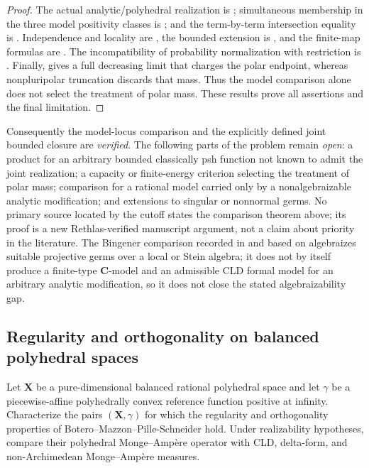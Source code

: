 \begin{proof}
The actual analytic/polyhedral realization is
; simultaneous membership in the three
model positivity classes is
; and the term-by-term
intersection equality is
.  Independence and locality
are , the bounded extension is
, and the finite-map formulas
are .  The incompatibility of
probability normalization with restriction is
.  Finally,
 gives a full decreasing limit that
charges the polar endpoint, whereas nonpluripolar truncation discards that
mass.  Thus the model comparison alone does not select the treatment of polar
mass.  These results prove all assertions and the final limitation.
\end{proof}

Consequently the model-locus comparison and the explicitly defined joint
bounded closure are \emph{verified}.  The following parts of the problem
remain \emph{open}: a product for an arbitrary
bounded classically psh function not known to admit the joint realization; a
capacity or finite-energy criterion selecting the treatment of polar mass;
comparison for a rational model carried only by a nonalgebraizable analytic
modification; and extensions to singular or nonnormal germs.  No primary
source located by the cutoff states the comparison theorem above; its proof
is a new Rethlas-verified manuscript argument, not a claim about priority in
the literature.  The Bingener comparison recorded in
 and based on
\cite[Aussage~2.8]{Bingener76Stein} algebraizes suitable projective germs over
a local or Stein algebra; it does not by itself produce a finite-type
\(\mathbf C\)-model and an admissible CLD formal model for an arbitrary
analytic modification, so it does not close the stated algebraizability gap.

\subsection{Regularity and orthogonality on balanced polyhedral spaces}
\label{sec:ch72-polyhedral}

\begin{problem}\label{prob:frontier-polyhedral-regularity}
Let \(\mathbf X\) be a pure-dimensional balanced rational polyhedral space
and let \(\gamma\) be a piecewise-affine polyhedrally convex reference
function positive at infinity.  Characterize the pairs
\((\mathbf X,\gamma)\) for which the
regularity and orthogonality properties of Botero--Mazzon--Pille-Schneider
hold.  Under realizability hypotheses, compare their polyhedral
Monge--Amp\`ere operator with CLD, delta-form, and non-Archimedean
Monge--Amp\`ere measures.
\end{problem}

